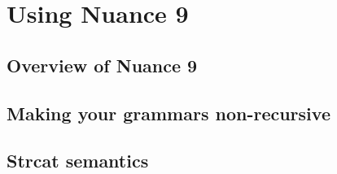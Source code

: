 \chapter{Using Nuance 9}
\label{Chapter:Nuance9}

\author{Manny Rayner}

\section{Overview of Nuance 9}
\label{Section:Nuance9Overview}

\section{Making your grammars non-recursive}
\label{Section:Nuance9Nonrecursive}

\section{Strcat semantics}
\label{Section:StrcatSemantics}


